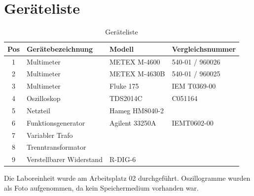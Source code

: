\section{Geräteliste}\label{sec:geraeteliste}

\begin{table}[h]
    \centering
    \caption{Geräteliste}\label{tab:geraeteliste}
    \begin{tabularx}{\columnwidth}{cXXX}
        Pos & \textbf{Gerätebezeichnung} & \textbf{Modell} & \textbf{Vergleichsnummer}\\ \midrule
        1 & Multimeter & METEX M-4600 & 540-01 / 960026\\
        2 & Multimeter & METEX M-4630B & 540-01 / 960025\\
        3 & Multimeter & Fluke 175 & IEM T0369-00\\
        4 & Oszilloskop & TDS2014C & C051164\\
        5 & Netzteil & Hameg HM8040-2 & \\
        6 & Funktionsgenerator & Agilent 33250A & IEMT0602-00\\
        7 & Variabler Trafo & & \\
        8 & Trenntransformator & & \\
        9 & Verstellbarer Widerstand & R-DIG-6 &
    \end{tabularx}
\end{table}

Die Laboreinheit wurde am Arbeitsplatz 02 durchgeführt. Oszillogramme wurden
als Foto aufgenommen, da kein Speichermedium vorhanden war.